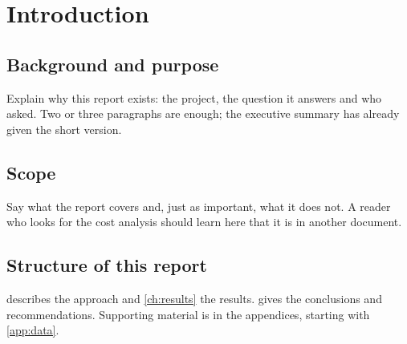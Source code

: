 \chapter{Introduction}
\label{ch:intro}

\section{Background and purpose}
Explain why this report exists: the project, the question it answers and who asked. Two or
three paragraphs are enough; the executive summary has already given the short version.

\section{Scope}
Say what the report covers and, just as important, what it does not. A reader who looks for
the cost analysis should learn here that it is in another document.

\section{Structure of this report}
 describes the approach and \cref{ch:results} the results.
 gives the conclusions and recommendations. Supporting material is in
the appendices, starting with \cref{app:data}.
